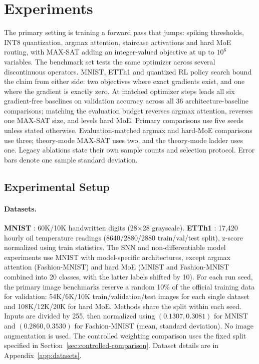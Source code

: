 \section{Experiments}\label{sec:experiments}

The primary setting is training a forward pass that jumps: spiking thresholds, INT8
quantization, argmax attention, staircase activations and hard MoE routing, with
MAX-SAT adding an integer-valued objective at up to $10^6$ variables. The benchmark set tests the same optimizer across several discontinuous operators. MNIST, ETTh1 and
quantized RL policy search bound the claim from either side: two objectives where
exact gradients exist, and one where the gradient is exactly zero.
At matched optimizer steps \sysname{} leads all six gradient-free baselines on
validation accuracy across all $36$ architecture-baseline comparisons; matching the
evaluation budget reverses argmax attention, reverses one MAX-SAT size, and levels
hard MoE. Primary comparisons use five seeds unless stated otherwise. Evaluation-matched
argmax and hard-MoE comparisons use three; theory-mode MAX-SAT uses two, and the
theory-mode ladder uses one. Legacy ablations state their own sample counts and
selection protocol. Error bars denote one sample standard deviation.

\subsection{Experimental Setup}\label{sec:setup}

\paragraph{Datasets.}
\textbf{MNIST} \citep{lecun1998gradient}: 60K/10K handwritten digits (28$\times$28 grayscale).
\textbf{ETTh1} \citep{zhou2021informer}: 17,420 hourly oil temperature readings (8640/2880/2880 train/val/test split), z-score normalized using train statistics.
The SNN and non-differentiable model experiments use MNIST with model-specific
architectures, except argmax attention (Fashion-MNIST) and hard MoE (MNIST
and Fashion-MNIST combined into 20 classes, with the latter labels shifted by 10).
For each run seed, the primary image benchmarks reserve a random 10\% of the official
training data for validation: 54K/6K/10K train/validation/test images for each
single dataset and 108K/12K/20K for hard MoE. Methods share the split within
each seed. Inputs are divided by 255, then normalized using $(0.1307,0.3081)$
for MNIST and $(0.2860,0.3530)$ for Fashion-MNIST (mean, standard deviation).
No image augmentation is used. The controlled weighting comparison uses the fixed
split specified in Section~\ref{sec:controlled-comparison}. Dataset details are
in Appendix~\ref{app:datasets}.

